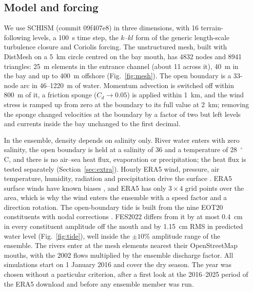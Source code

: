 \documentclass[a4paper,fleqn]{ems-dc}
\begin{document}
\subsection{Model and forcing}\label{sec:model}
We use SCHISM \citep{Zhang2008,Zhang2016} (commit 09f407e8) in three dimensions, with 16
terrain-following levels, a 100~s time step, the $k$--$kl$ form of the generic length-scale
turbulence closure \citep{Umlauf2003,Warner2005} and Coriolis forcing. The unstructured
mesh, built with DistMesh \citep{Persson2004} on a 5~km circle centred on the bay mouth, has
4832 nodes and 8941 triangles: 25~m elements in the entrance channel (about 11 across it),
40~m in the bay and up to 400~m offshore (Fig.~\ref{fig:mesh}). The open boundary is a
33-node arc in 46--1220~m of water. Momentum advection is switched off within 800~m of it, a
friction sponge ($C_d \to 0.05$) is applied within 1~km, and the wind stress is ramped up
from zero at the boundary to its full value at 2~km; removing the sponge changed velocities
at the boundary by a factor of two but left levels and currents inside the bay unchanged to
the first decimal.

In the ensemble, density depends on salinity only. River water enters with zero salinity,
the open boundary is held at a salinity of 36 and a temperature of 28~$^\circ$C, and there
is no air--sea heat flux, evaporation or precipitation; the heat flux is tested separately
(Section~\ref{sec:extra}). Hourly ERA5 wind, pressure, air temperature, humidity, radiation
and precipitation drive the surface \citep{Hersbach2020}. ERA5 surface winds have known
biases \citep{BelmonteRivas2019}, and ERA5 has only $3 \times 4$ grid points over the area,
which is why the wind enters the ensemble with a speed factor and a direction rotation. The
open-boundary tide is built from the nine EOT20 constituents with nodal corrections
\citep{Pugh2014}. FES2022 differs from it by at most 0.4~cm in every constituent amplitude
off the mouth and by 1.15~cm RMS in predicted water level (Fig.~\ref{fig:tide}), well
inside the $\pm10\%$ amplitude range of the ensemble. The rivers enter at the mesh elements
nearest their OpenStreetMap mouths, with the 2002 flows multiplied by the ensemble discharge
factor. All simulations start on 1 January 2016 and cover the dry season. The year was
chosen without a particular criterion, after a first look at the 2016--2025 period of the
ERA5 download and before any ensemble member was run.
\end{document}

